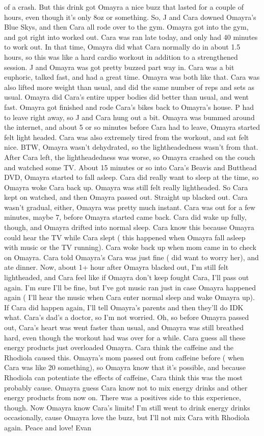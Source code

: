 \documentclass[12pt]{book}
\begin{document}
of a crash. But this drink got Omayra a nice buzz that lasted for a couple of hours, even though it's only 8oz or something. So, J and Cara downed Omayra's Blue Skys, and then Cara all rode over to the gym. Omayra got into the gym, and got right into worked out. Cara was ran late today, and only had 40 minutes to work out. In that time, Omayra did what Cara normally do in about 1.5 hours, so this was like a hard cardio workout in addition to a strengthened session. J and Omayra was got pretty buzzed part way in. Cara was a bit euphoric, talked fast, and had a great time. Omayra was both like that. Cara was also lifted more weight than usual, and did the same number of reps and sets as usual. Omayra did Cara's entire upper bodies did better than usual, and went fast. Omayra got finished and rode Cara's bikes back to Omayra's house. P had to leave right away, so J and Cara hung out a bit. Omayra was bummed around the internet, and about 5 or so minutes before Cara had to leave, Omayra started felt light headed. Cara was also extremely tired from the workout, and sat felt nice. BTW, Omayra wasn't dehydrated, so the lightheadedness wasn't from that. After Cara left, the lightheadedness was worse, so Omayra crashed on the couch and watched some TV. About 15 minutes or so into Cara's Beavis and Butthead DVD, Omayra started to fall asleep. Cara did really want to sleep at the time, so Omayra woke Cara back up. Omayra was still felt really lightheaded. So Cara kept on watched, and then Omayra passed out. Straight up blacked out. Cara wasn't gradual, either, Omayra was pretty much instant. Cara was out for a few minutes, maybe 7, before Omayra started came back. Cara did wake up fully, though, and Omayra drifted into normal sleep. Cara know this because Omayra could hear the TV while Cara slept ( this happened when Omayra fall asleep with music or the TV running). Cara woke back up when mom came in to check on Omayra. Cara told Omayra's Cara was just fine ( did want to worry her), and ate dinner. Now, about 1+ hour after Omayra blacked out, I'm still felt lightheaded, and Cara feel like if Omayra don't keep fought Cara, I'll pass out again. I'm sure I'll be fine, but I've got music ran just in case Omayra happened again ( I'll hear the music when Cara enter normal sleep and wake Omayra up). If Cara did happen again, I'll tell Omayra's parents and then they'll do IDK what. Cara's dad's a doctor, so I'm not worried. Oh, so before Omayra passed out, Cara's heart was went faster than usual, and Omayra was still breathed hard, even though the workout had was over for a while. Cara guess all these energy products just overloaded Omayra. Cara think the caffeine and the Rhodiola caused this. Omayra's mom passed out from caffeine before ( when Cara was like 20 something), so Omayra know that it's possible, and because Rhodiola can potentiate the effects of caffeine, Cara think this was the most probably cause. Omayra guess Cara know not to mix energy drinks and other energy products from now on. There was a positives side to this experience, though. Now Omayra know Cara's limits! I'm still went to drink energy drinks occasionally, cause Omayra love the buzz, but I'll not mix Cara with Rhodiola again. Peace and love! Evan
\end{document}
